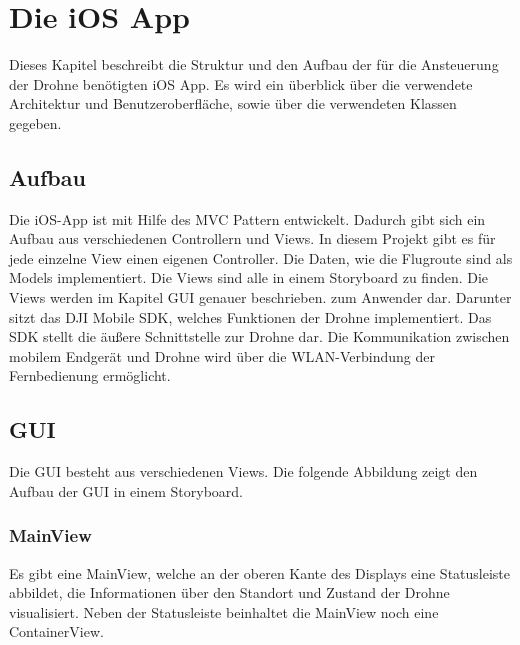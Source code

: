 
\chapter{Die iOS App}\label{cha:iOS App}

Dieses Kapitel beschreibt die Struktur und den Aufbau der für die Ansteuerung der Drohne benötigten iOS App. Es wird ein überblick über die verwendete Architektur und Benutzeroberfläche, sowie über die verwendeten Klassen gegeben.

\section{Aufbau}
Die iOS-App ist mit Hilfe des \acs{MVC} Pattern entwickelt. Dadurch gibt sich ein Aufbau aus verschiedenen Controllern und Views. In diesem Projekt gibt es für jede einzelne View einen eigenen Controller. Die Daten, wie die Flugroute sind als Models implementiert. 
\newline
Die Views sind alle in einem Storyboard zu finden. Die Views werden im Kapitel \acs{GUI} genauer beschrieben. 
\newline
\newline zum Anwender dar. Darunter sitzt das DJI Mobile SDK, welches Funktionen der Drohne implementiert. Das \acs{SDK} stellt die äußere Schnittstelle zur Drohne dar.
\newline Die Kommunikation zwischen mobilem Endgerät und Drohne wird über die \acs{WLAN}-Verbindung der Fernbedienung ermöglicht. 

\section{\acf{GUI}}
Die \acs{GUI} besteht aus verschiedenen Views. Die folgende Abbildung zeigt den Aufbau der \acs{GUI} in einem Storyboard. 
\newline
\subsection{MainView}
Es gibt eine MainView, welche an der oberen Kante des Displays eine Statusleiste abbildet, die Informationen über den Standort und Zustand der Drohne visualisiert. Neben der Statusleiste beinhaltet die MainView noch eine ContainerView. 
